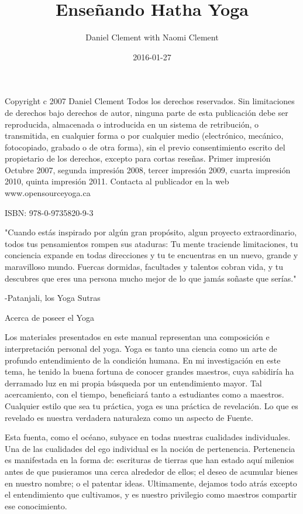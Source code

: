 \documentclass[a4paper]{book}
\title{Enseñando Hatha Yoga}
\date{2016-01-27}
\author{Daniel Clement with Naomi Clement}
\begin{document}
\maketitle

\newpage
Copyright c 2007 Daniel Clement
Todos los derechos reservados. Sin limitaciones de derechos bajo derechos de autor, ninguna parte de esta publicación debe ser reproducida, almacenada o introducida en un sistema de
retribución, o transmitida, en cualquier forma o por cualquier medio (electrónico, mecánico, fotocopiado, grabado o de otra forma), sin el previo consentimiento escrito del propietario de los derechos, excepto para cortas reseñas.
Primer impresión Octubre 2007, segunda impresión 2008, tercer impresión 2009, cuarta impresión 2010, quinta impresión 2011.
Contacta al publicador en la web www.opensourceyoga.ca

ISBN: 978-0-9735820-9-3

\newpage
\tableofcontents

\newpage
"Cuando estás inspirado por algún gran propósito, algun proyecto extraordinario, todos tus pensamientos rompen sus ataduras: Tu mente traciende limitaciones, tu conciencia expande en todas direcciones y tu te encuentras en un nuevo, grande y maravilloso mundo. Fuercas dormidas, facultades y talentos cobran vida, y tu descubres que eres una persona mucho mejor de lo que jamás soñaste que serías."

-Patanjali, los Yoga Sutras

\newpage
Acerca de poseer el Yoga

Los materiales presentados en este manual representan una composición e interpretación personal del yoga. Yoga es tanto una ciencia como un arte de profundo entendimiento de la condición humana. En mi investigación en este tema, he tenido la buena fortuna de conocer grandes maestros, cuya sabidiría ha derramado luz en mi propia búsqueda por un entendimiento mayor. Tal acercamiento, con el tiempo, beneficiará tanto a estudiantes como a maestros. Cualquier estilo que sea tu práctica, yoga es una práctica de revelación. Lo que es revelado es nuestra verdadera naturaleza como un aspecto de Fuente.

Esta fuenta, como el océano, subyace en todas nuestras cualidades individuales. Una de las cualidades del ego individual es la noción de pertenencia. Pertenencia es manifestada en la forma de: escrituras de tierras que han estado aquí milenios antes de que pusieramos una cerca alrededor de ellos; el deseo de acumular bienes en nuestro nombre; o el patentar ideas. Ultimamente, dejamos todo atrás excepto el entendimiento que cultivamos, y es nuestro privilegio como maestros compartir ese conocimiento.
\end{document}
